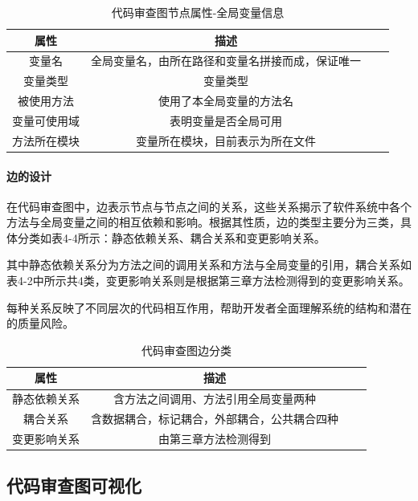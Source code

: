 \begin{table}[htbp]
\caption{代码审查图节点属性-全局变量信息}
\vspace{0.5em}\centering\wuhao
\begin{tabular}{cccc}
\toprule
    属性 & 描述 \\
\midrule
变量名 & 全局变量名，由所在路径和变量名拼接而成，保证唯一  \\
变量类型 & 变量类型   \\
被使用方法 & 使用了本全局变量的方法名   \\
变量可使用域 & 表明变量是否全局可用   \\
方法所在模块 &  变量所在模块，目前表示为所在文件  \\  
\bottomrule
\end{tabular}
\end{table}


\paragraph{边的设计}

在代码审查图中，边表示节点与节点之间的关系，这些关系揭示了软件系统中各个方法与全局变量之间的相互依赖和影响。根据其性质，边的类型主要分为三类，具体分类如表4-4所示：静态依赖关系、耦合关系和变更影响关系。

其中静态依赖关系分为方法之间的调用关系和方法与全局变量的引用，耦合关系如表4-2中所示共4类，变更影响关系则是根据第三章方法检测得到的变更影响关系。

每种关系反映了不同层次的代码相互作用，帮助开发者全面理解系统的结构和潜在的质量风险。

\begin{table}[htbp]
\caption{代码审查图边分类}
\vspace{0.5em}\centering\wuhao
\begin{tabular}{cccc}
\toprule
属性 & 描述 \\
\midrule
静态依赖关系 & 含方法之间调用、方法引用全局变量两种  \\
耦合关系 & 含数据耦合，标记耦合，外部耦合，公共耦合四种   \\
变更影响关系 & 由第三章方法检测得到  \\
\bottomrule
\end{tabular}
\end{table}



\subsection{代码审查图可视化}

